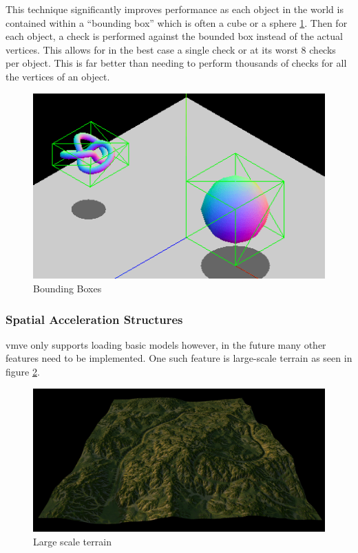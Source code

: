 \documentclass[11pt]{article}
\begin{document}
This technique significantly improves performance as each object in the world is
contained within a ``bounding box'' which is often a cube or a sphere
\ref{fig:bounding_boxes}. Then for each object, a check is performed against the
bounded box instead of the actual vertices. This allows for in the best case a
single check or at its worst 8 checks per object. This is far better than
needing to perform thousands of checks for all the vertices of an object.

\begin{figure}[H]
  \centering
  \includegraphics[width=\textwidth]{images/bounding_boxes.png}
  \caption{Bounding Boxes \cite{bounding_boxes}}
  \label{fig:bounding_boxes}
\end{figure}


\subsubsection*{Spatial Acceleration Structures}
\gls*{vmve} only supports loading basic models however, in the future many other
features need to be implemented. One such feature is large-scale terrain as seen
in figure \ref{fig:quad_tree_terrain}.

\begin{figure}[H]
  \centering
  \includegraphics[width=\textwidth]{images/quad_tree_terrain.png}
  \caption{Large scale terrain}
  \label{fig:quad_tree_terrain}
\end{figure}
\end{document}
